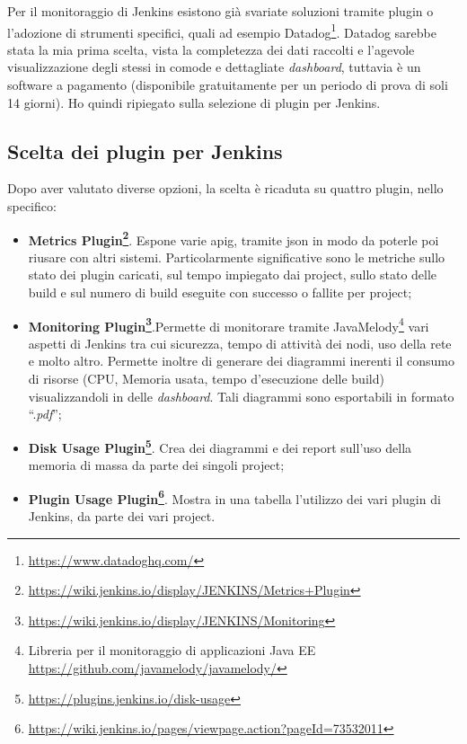 Per il monitoraggio di Jenkins esistono già svariate soluzioni tramite \gls{plugin} o l'adozione di strumenti specifici, quali ad esempio Datadog\footnote{\url{https://www.datadoghq.com/}}. Datadog sarebbe stata la mia prima scelta, vista la completezza dei dati raccolti e l'agevole visualizzazione degli stessi in comode e dettagliate \textit{dashboard}, tuttavia è un software a pagamento (disponibile gratuitamente per un periodo di prova di soli 14 giorni). Ho quindi ripiegato sulla selezione di \gls{plugin} per Jenkins.

\subsection{Scelta dei plugin per Jenkins}
\label{subsec:scelta-plugin}

Dopo aver valutato diverse opzioni, la scelta è ricaduta su quattro \gls{plugin}, nello specifico:

\begin{itemize}
    \item \textbf{Metrics Plugin\footnote{\url{https://wiki.jenkins.io/display/JENKINS/Metrics+Plugin}}}. Espone varie \gls{apig}, tramite \gls{json} in modo da poterle poi riusare
    con altri sistemi. Particolarmente significative sono le metriche sullo stato dei \gls{plugin}
    caricati, sul tempo impiegato dai \gls{project}, sullo stato delle \gls{build} e sul numero di build eseguite con successo o fallite per project;
    \item \textbf{Monitoring Plugin\footnote{\url{https://wiki.jenkins.io/display/JENKINS/Monitoring}}}.Permette di monitorare tramite
    JavaMelody\footnote{Libreria per il monitoraggio di applicazioni \gls{Java EE} \url{https://github.com/javamelody/javamelody/}} vari aspetti di Jenkins tra cui
    sicurezza, tempo di attività dei nodi, uso della rete e molto altro. Permette inoltre di generare dei diagrammi inerenti il consumo di risorse (CPU, Memoria usata, tempo d'esecuzione delle build) visualizzandoli in delle \textit{dashboard}. Tali diagrammi sono esportabili in formato ``.\textit{pdf}'';
    \item \textbf{Disk Usage Plugin\footnote{\url{https://plugins.jenkins.io/disk-usage}}}. Crea dei diagrammi e dei report sull'uso della memoria di massa da parte dei singoli \gls{project};
    \item \textbf{Plugin Usage Plugin\footnote{\url{https://wiki.jenkins.io/pages/viewpage.action?pageId=73532011}}}. Mostra in una tabella l'utilizzo dei vari \gls{plugin} di Jenkins, da parte dei vari \gls{project}.
\end{itemize}


